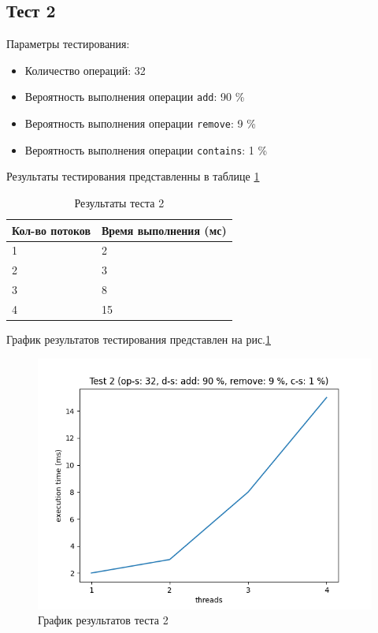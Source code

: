 \subsection*{Тест 2}

Параметры тестирования:

\begin{itemize}
    \item Количество операций: 32
    \item Вероятность выполнения операции \verb|add|: 90 \%
    \item Вероятность выполнения операции \verb|remove|: 9 \%
    \item Вероятность выполнения операции \verb|contains|: 1 \%
\end{itemize}

Результаты тестирования представленны в таблице \ref{tab:results2}


\begin{table}[H]
    \centering
    \begin{tabular}{|l|l|}
        \hline
        Кол-во потоков & Время выполнения (мс) \\
        \hline
        1 & 2 \\
        \hline
        2 & 3 \\
        \hline
        3 & 8 \\
        \hline
        4 & 15 \\
        \hline
    \end{tabular}
    \caption{Результаты теста 2}
    \label{tab:results2}
\end{table}
        

График результатов тестирования представлен на рис.\ref{fig:plot2}

\begin{figure}[H]
    \centering
    \includegraphics[width=0.7\linewidth]{photo/plot2}
    \caption{График результатов теста 2}
    \label{fig:plot2}
\end{figure}

